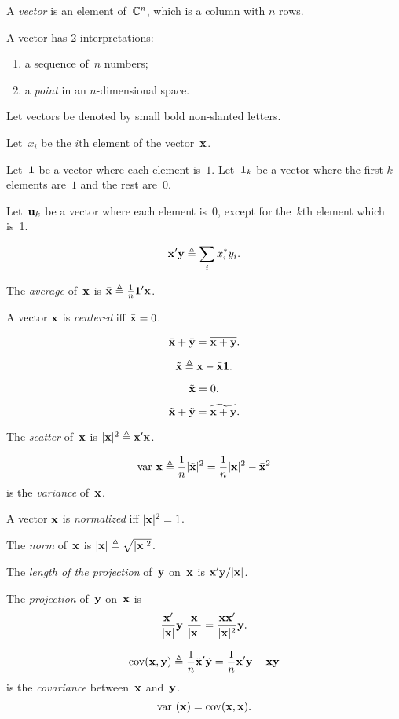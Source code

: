 \documentclass[10pt,a4paper]{article}
\theoremstyle{plain} \newtheorem{Lem}{Lemma}
\begin{document}
A {\em vector} is an element of~$\mathbb C^n$, which is a column with $n$ rows.

A vector has 2 interpretations:
\begin{enumerate}
  \item a sequence of~$n$ numbers;
  \item a {\em point} in an $n$-dimensional space.
\end{enumerate}


Let vectors be denoted by small bold non-slanted letters.

Let~$x_i$ be the $i$th element of the vector~$\mathbf x$.

Let~$\mathbf 1$ be a vector where each element is~$1$.
Let~$\mathbf 1_k$ be a vector where the first $k$ elements are~$1$ and the rest are~$0$.

Let~$\mathbf u_k$ be a vector where each element is~0, except for the~$k$th element which is~1.

$$ \mathbf x' \mathbf y \triangleq \sum_i x_i^* y_i. $$

The {\em average} of~$\mathbf x$ is $\bar {\mathbf x} \triangleq \frac 1 n \mathbf 1' \mathbf x$.

A vector $\mathbf x$ is {\em centered} iff $\bar{\mathbf x} = 0$.

$$ \bar {\mathbf x} + \bar {\mathbf y} = \overline {\mathbf x + \mathbf y}. $$

$$ \tilde {\mathbf x} \triangleq \mathbf x - \bar {\mathbf x} {\mathbf 1}. $$

$$\bar {\tilde {\mathbf x}} = 0. $$

$$ \tilde {\mathbf x} + \tilde {\mathbf y} = \widetilde {\mathbf x + \mathbf y}. $$

The {\em scatter} of~$\mathbf x$ is $|\mathbf x|^2 \triangleq \mathbf x' \mathbf x$.

$$ \mathrm {var} \  \mathbf x \triangleq \frac 1 n |\tilde {\mathbf x}|^2 = \frac 1 n |\mathbf x|^2 - \bar{\mathbf x}^2 $$
is the {\em variance} of~$\mathbf x$.

A vector $\mathbf x$ is {\em normalized} iff $|\mathbf x|^2 = 1$.

The {\em norm} of~$\mathbf x$ is $|\mathbf x| \triangleq \sqrt{|\mathbf x|^2}$.

The {\em length of the projection} of~$\mathbf y$ on~$\mathbf x$ is $\mathbf x' \mathbf y / |\mathbf x|$.

The {\em projection} of~$\mathbf y$ on~$\mathbf x$ is
\begin{equation} \label{vecProjection}
  \frac {\mathbf x'} {|\mathbf x|}  \mathbf y \ \frac {\mathbf x} {|\mathbf x|} = \frac {\mathbf x \mathbf x'} {|\mathbf x|^2} \mathbf y.
\end{equation}

$$ \mathrm {cov} (\mathbf x, \mathbf y) \triangleq \frac 1 n \tilde {\mathbf x}' \tilde {\mathbf y} = \frac 1 n \mathbf x' \mathbf y - \bar{\mathbf x} \bar{\mathbf y} $$
is the {\em covariance} between~$\mathbf x$ and~$\mathbf y$.
$$ \mathrm {var} \  (\mathbf x) = \mathrm {cov}(\mathbf x,\mathbf x). $$
\end{document}
